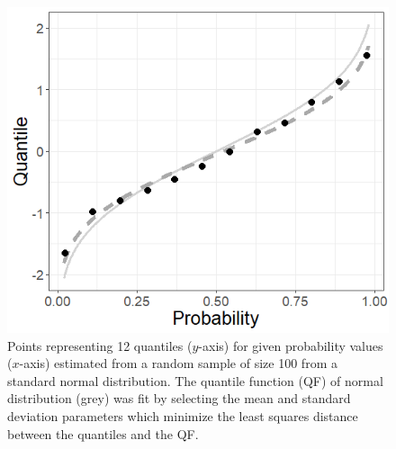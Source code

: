 \documentclass[preprint,12pt,authoryear]{elsarticle}
\begin{document}
\begin{figure}[hbt!]
    \centering
    \includegraphics[scale=.5]{Images/fit_quantiles_example.png}
    \caption{Points representing 12 quantiles ($y$-axis) for given probability values ($x$-axis) estimated from a random sample of size 100 from a standard normal distribution. The quantile function (QF) of normal distribution (grey) was fit by selecting the mean and standard deviation parameters which minimize the least squares distance between the quantiles and the QF.}
    \label{fig:quant_match_example}
\end{figure}
\end{document}

